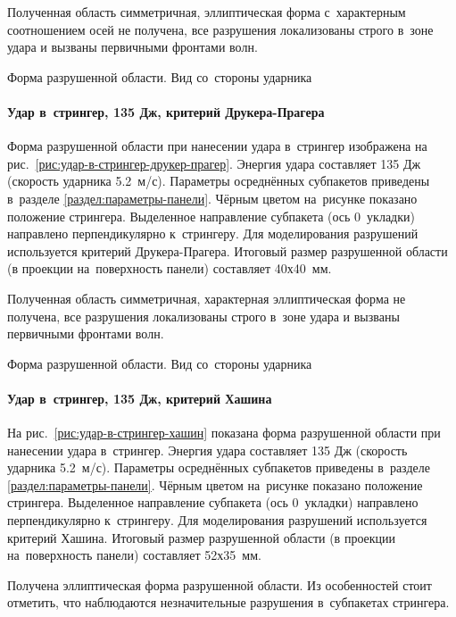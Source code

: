 \documentclass[thesis.tex]{subfiles}
\begin{document}
Полученная область симметричная, эллиптическая форма с~характерным соотношением осей не получена, все разрушения
локализованы строго в~зоне удара и вызваны первичными фронтами волн.

    {Форма разрушенной области. Вид со~стороны ударника}

\newpage
\paragraph{Удар в~стрингер, 135 Дж, критерий Друкера-Прагера}

Форма разрушенной области при нанесении удара в~стрингер изображена на рис.~\ref{рис:удар-в-стрингер-друкер-прагер}.
Энергия удара составляет 135 Дж (скорость ударника 5.2~м/с). Параметры осреднённых субпакетов приведены в~разделе
\ref{раздел:параметры-панели}. Чёрным цветом на~рисунке показано положение стрингера. Выделенное направление субпакета
(ось 0\degree\ укладки) направлено перпендикулярно к~стрингеру. Для моделирования разрушений используется критерий
Друкера-Прагера. Итоговый размер разрушенной области (в проекции на~поверхность панели) составляет 40х40~мм.

Полученная область симметричная, характерная эллиптическая форма не получена, все разрушения локализованы строго в~зоне
удара и вызваны первичными фронтами волн.

    {Форма разрушенной области. Вид со~стороны ударника}

\newpage
\paragraph{Удар в~стрингер, 135 Дж, критерий Хашина}

На рис.~\ref{рис:удар-в-стрингер-хашин} показана форма разрушенной области при нанесении удара в~стрингер. Энергия удара
составляет 135 Дж (скорость ударника 5.2~м/с). Параметры осреднённых субпакетов приведены в~разделе
\ref{раздел:параметры-панели}. Чёрным цветом на~рисунке показано положение стрингера. Выделенное направление субпакета (ось
0\degree\ укладки) направлено перпендикулярно к~стрингеру. Для моделирования разрушений используется критерий Хашина.
Итоговый размер разрушенной области (в проекции на~поверхность панели) составляет 52х35~мм.

Получена эллиптическая форма разрушенной области. Из особенностей стоит отметить, что наблюдаются незначительные
разрушения в~субпакетах стрингера.
\end{document}
